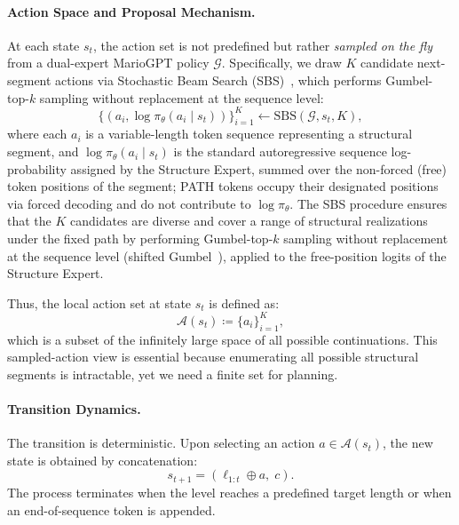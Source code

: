 \documentclass[11pt,a4paper]{article}
\begin{document}
\paragraph{Action Space and Proposal Mechanism.}
At each state \(s_t\), the action set is not predefined but rather \emph{sampled on the fly} from a dual-expert MarioGPT policy \(\mathcal{G}\). Specifically, we draw \(K\) candidate next-segment actions via Stochastic Beam Search (SBS)~\cite{kool2019}, which performs Gumbel-top-\(k\) sampling without replacement at the sequence level:
\begin{equation}
    \{(a_i, \log \pi_\theta(a_i \mid s_t))\}_{i=1}^K \leftarrow \mathrm{SBS}(\mathcal{G}, s_t, K),
    \label{eq:action_proposal}
\end{equation}
where each \(a_i\) is a variable-length token sequence representing a structural segment, and \(\log \pi_\theta(a_i \mid s_t)\) is the standard autoregressive sequence log-probability assigned by the Structure Expert, summed over the non-forced (free) token positions of the segment; PATH tokens occupy their designated positions via forced decoding and do not contribute to \(\log \pi_\theta\). The SBS procedure ensures that the \(K\) candidates are diverse and cover a range of structural realizations under the fixed path by performing Gumbel-top-\(k\) sampling without replacement at the sequence level (shifted Gumbel~\cite{kool2019}), applied to the free-position logits of the Structure Expert.

Thus, the local action set at state \(s_t\) is defined as:
\begin{equation}
    \mathcal{A}(s_t) \coloneqq \{a_i\}_{i=1}^K,
    \label{eq:local_action_set}
\end{equation}
which is a subset of the infinitely large space of all possible continuations. This sampled-action view is essential because enumerating all possible structural segments is intractable, yet we need a finite set for planning.

\paragraph{Transition Dynamics.}
The transition is deterministic. Upon selecting an action \(a \in \mathcal{A}(s_t)\), the new state is obtained by concatenation:
\begin{equation}
    s_{t+1} = (\ell_{1:t} \oplus a,\; c).
    \label{eq:transition}
\end{equation}
The process terminates when the level reaches a predefined target length or when an end-of-sequence token is appended.
\end{document}
